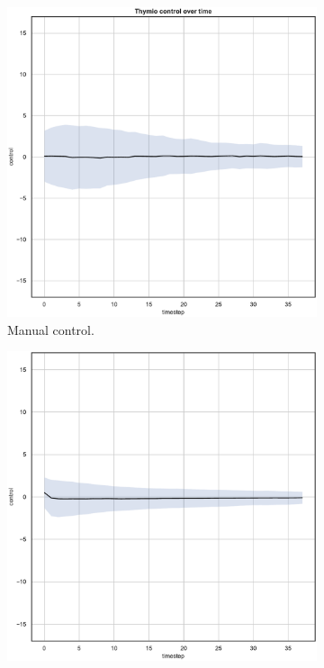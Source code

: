 \begin{figure}[!htb]\ContinuedFloat
	\begin{center}
		\begin{subfigure}[h]{0.35\textwidth}			
			\includegraphics[width=\textwidth]{contents/images/net-d15/control-overtime-manual}%
			\caption{Manual control.}
		\end{subfigure}
		\hspace{1cm}
		\begin{subfigure}[h]{0.35\textwidth}
			\includegraphics[width=\textwidth]{contents/images/net-c15/control-overtime-learned_communication}

\end{subfigure}
\end{center}
\end{figure}
